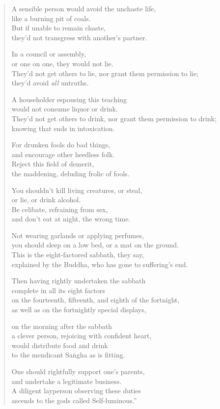 \documentclass[12pt,openany]{book}%
\begin{document}
\begin{verse}
A sensible person would avoid the unchaste life, \\
like a burning pit of coals. \\
But if unable to remain chaste, \\
they’d not transgress with another’s partner. 

In a council or assembly, \\
or one on one, they would not lie. \\
They’d not get others to lie, nor grant them permission to lie; \\
they’d avoid \emph{all} untruths. 

A householder espousing this teaching \\
would not consume liquor or drink. \\
They’d not get others to drink, nor grant them permission to drink; \\
knowing that ends in intoxication. 

For drunken fools do bad things, \\
and encourage other heedless folk. \\
Reject this field of demerit, \\
the maddening, deluding frolic of fools. 

You shouldn’t kill living creatures, or steal, \\
or lie, or drink alcohol. \\
Be celibate, refraining from sex, \\
and don’t eat at night, the wrong time. 

Not wearing garlands or applying perfumes, \\
you should sleep on a low bed, or a mat on the ground. \\
This is the eight-factored sabbath, they say, \\
explained by the Buddha, who has gone to suffering’s end. 

Then having rightly undertaken the sabbath \\
complete in all its eight factors \\
on the fourteenth, fifteenth, and eighth of the fortnight, \\
as well as on the fortnightly special displays, 

on the morning after the sabbath \\
a clever person, rejoicing with confident heart, \\
would distribute food and drink \\
to the mendicant \textsanskrit{Saṅgha} as is fitting. 

One should rightfully support one’s parents, \\
and undertake a legitimate business. \\
A diligent layperson observing these duties \\
ascends to the gods called Self-luminous.” 

%
\end{verse}
\end{document}
